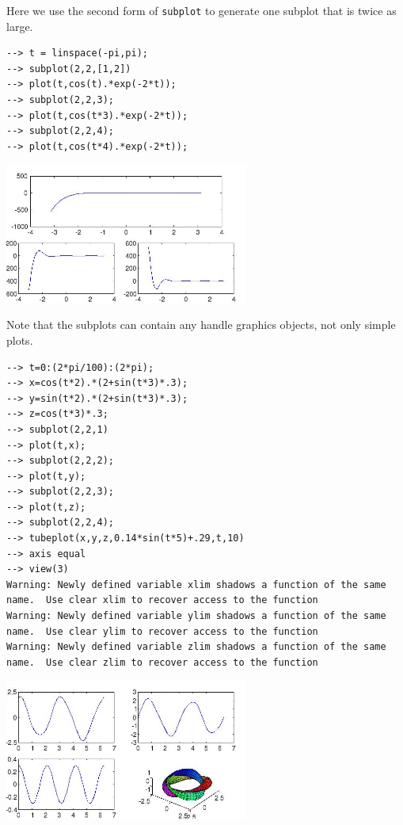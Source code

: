 Here we use the second form of \verb|subplot| to generate one subplot
that is twice as large.
\begin{verbatim}
--> t = linspace(-pi,pi);
--> subplot(2,2,[1,2])
--> plot(t,cos(t).*exp(-2*t));
--> subplot(2,2,3);
--> plot(t,cos(t*3).*exp(-2*t));
--> subplot(2,2,4);
--> plot(t,cos(t*4).*exp(-2*t));
\end{verbatim}


\centerline{\includegraphics[width=8cm]{subplot2}}

Note that the subplots can contain any handle graphics objects,
not only simple plots.
\begin{verbatim}
--> t=0:(2*pi/100):(2*pi);
--> x=cos(t*2).*(2+sin(t*3)*.3);
--> y=sin(t*2).*(2+sin(t*3)*.3);
--> z=cos(t*3)*.3;
--> subplot(2,2,1)
--> plot(t,x);
--> subplot(2,2,2);
--> plot(t,y);
--> subplot(2,2,3);
--> plot(t,z);
--> subplot(2,2,4);
--> tubeplot(x,y,z,0.14*sin(t*5)+.29,t,10)
--> axis equal
--> view(3)
Warning: Newly defined variable xlim shadows a function of the same name.  Use clear xlim to recover access to the function
Warning: Newly defined variable ylim shadows a function of the same name.  Use clear ylim to recover access to the function
Warning: Newly defined variable zlim shadows a function of the same name.  Use clear zlim to recover access to the function
\end{verbatim}


\centerline{\includegraphics[width=8cm]{subplot3}}

